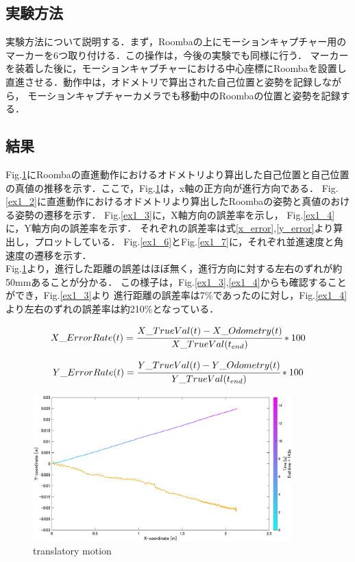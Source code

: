 \documentclass[a4paper,11pt]{jsarticle}
\begin{document}
\subsection{実験方法}
実験方法について説明する．まず，Roombaの上にモーションキャプチャー用のマーカーを6つ取り付ける．この操作は，今後の実験でも同様に行う．
マーカーを装着した後に，モーションキャプチャーにおける中心座標にRoombaを設置し直進させる．動作中は，オドメトリで算出された自己位置と姿勢を記録しながら，
モーションキャプチャーカメラでも移動中のRoombaの位置と姿勢を記録する．

\subsection{結果}
Fig.\ref{ex1_1}にRoombaの直進動作におけるオドメトリより算出した自己位置と自己位置の真値の推移を示す．ここで，Fig.\ref{ex1_1}は，x軸の正方向が進行方向である．
Fig.\ref{ex1_2}に直進動作におけるオドメトリより算出したRoombaの姿勢と真値のおける姿勢の遷移を示す．
Fig.\ref{ex1_3}に，X軸方向の誤差率を示し，
Fig.\ref{ex1_4}に，Y軸方向の誤差率を示す．
それぞれの誤差率は式\ref{x_error},\ref{y_error}より算出し，プロットしている．
Fig.\ref{ex1_6}とFig.\ref{ex1_7}に，それぞれ並進速度と角速度の遷移を示す．\\
Fig.\ref{ex1_1}より，進行した距離の誤差はほぼ無く，進行方向に対する左右のずれが約50mmあることが分かる．
この様子は，Fig.\ref{ex1_3},\ref{ex1_4}からも確認することができ，Fig.\ref{ex1_3}より
進行距離の誤差率は7\%であったのに対し，Fig.\ref{ex1_4}より左右のずれの誤差率は約210\%となっている．


\begin{align}\label{x_error}
  X\_Error Rate(t) = \cfrac{X\_True Val(t) - X\_Odometry(t)}{X\_True Val(t_{end})}* 100
\end{align}

\begin{align}\label{y_error}
  Y\_Error Rate(t) = \cfrac{Y\_True Val(t) - Y\_Odometry(t)}{Y\_True Val(t_{end})}* 100
\end{align}

\begin{figure}[H]\centering
\includegraphics[width=100mm]{figure/1_1.eps}
\caption{translatory motion}
\label{ex1_1}\vspace{0zh}\end{figure}
\end{document}
